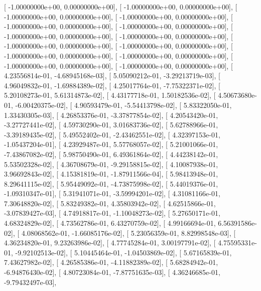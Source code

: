 \documentclass{article}
\begin{document}
       [ -1.00000000e+00,   0.00000000e+00],
       [ -1.00000000e+00,   0.00000000e+00],
       [ -1.00000000e+00,   0.00000000e+00],
       [ -1.00000000e+00,   0.00000000e+00],
       [ -1.00000000e+00,   0.00000000e+00],
       [ -1.00000000e+00,   0.00000000e+00],
       [ -1.00000000e+00,   0.00000000e+00],
       [ -1.00000000e+00,   0.00000000e+00],
       [ -1.00000000e+00,   0.00000000e+00],
       [ -1.00000000e+00,   0.00000000e+00],
       [ -1.00000000e+00,   0.00000000e+00],
       [ -1.00000000e+00,   0.00000000e+00],
       [ -1.00000000e+00,   0.00000000e+00],
       [ -1.00000000e+00,   0.00000000e+00],
       [  4.23556814e-01,  -4.68945168e-03],
       [  5.05090212e-01,  -3.29213719e-03],
       [  4.96049832e-01,  -1.69884389e-02],
       [  4.25017764e-01,  -7.75322371e-02],
       [  5.20108273e-01,   5.61314873e-02],
       [  4.43177718e-01,   1.50182536e-02],
       [  4.50673680e-01,  -6.00420375e-02],
       [  4.90593479e-01,  -5.54413798e-02],
       [  5.83322050e-01,   1.33430305e-03],
       [  4.26853376e-01,  -3.37877854e-02],
       [  4.20543420e-01,  -3.27727441e-02],
       [  4.59730290e-01,   3.01683736e-02],
       [  5.62788966e-01,  -3.39189435e-02],
       [  5.49552402e-01,  -2.43462551e-02],
       [  4.32397153e-01,  -1.05437204e-01],
       [  4.23929487e-01,   5.57768057e-02],
       [  5.21001066e-01,  -7.43867082e-02],
       [  5.98750490e-01,   6.49361864e-02],
       [  4.44238142e-01,   5.53502328e-02],
       [  4.36708679e-01,  -9.29158815e-02],
       [  4.10087938e-01,   3.96692843e-02],
       [  4.15381819e-01,  -1.87911566e-04],
       [  5.98413948e-01,   8.29641115e-02],
       [  5.95449092e-01,  -4.73875998e-02],
       [  5.44019376e-01,  -1.09310347e-01],
       [  5.31941071e-01,  -3.59994201e-02],
       [  4.31081166e-01,   7.30648820e-02],
       [  5.83249382e-01,   4.35803942e-02],
       [  4.62515866e-01,  -3.07839427e-03],
       [  4.74918817e-01,  -1.10048273e-02],
       [  5.27650171e-01,   4.68324829e-02],
       [  4.73562786e-01,   6.43270759e-02],
       [  4.99166694e-01,   6.56391586e-02],
       [  4.08068562e-01,  -1.66085176e-02],
       [  5.23056359e-01,   8.82998548e-03],
       [  4.36234820e-01,   9.23263986e-02],
       [  4.77745284e-01,   3.00197791e-02],
       [  4.75595331e-01,  -9.92102513e-02],
       [  5.10445464e-01,  -1.04503869e-02],
       [  5.67165839e-01,   7.43627982e-02],
       [  4.26585386e-01,  -4.11882389e-02],
       [  5.68284942e-01,  -6.94876430e-02],
       [  4.80723084e-01,  -7.87751635e-03],
       [  4.36246685e-01,  -9.79432497e-03],
\end{document}

